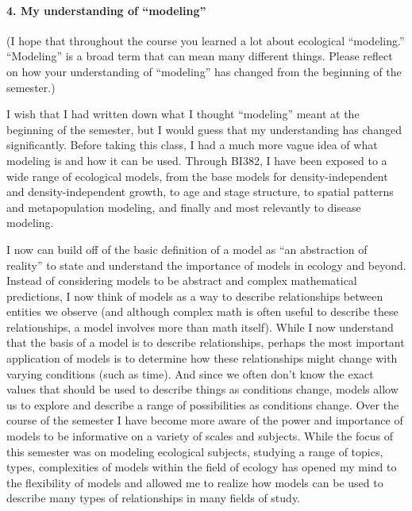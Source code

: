 \documentclass[]{article}
\let\oldparagraph\paragraph
\renewcommand{\paragraph}[1]{\oldparagraph{#1}\mbox{}}
\begin{document}
\hypertarget{my-understanding-of-modeling}{%
\paragraph{4. My understanding of
``modeling''}\label{my-understanding-of-modeling}}

(I hope that throughout the course you learned a lot about ecological
``modeling.'' ``Modeling'' is a broad term that can mean many different
things. Please reflect on how your understanding of ``modeling'' has
changed from the beginning of the semester.)

I wish that I had written down what I thought ``modeling'' meant at the
beginning of the semester, but I would guess that my understanding has
changed significantly. Before taking this class, I had a much more vague
idea of what modeling is and how it can be used. Through BI382, I have
been exposed to a wide range of ecological models, from the base models
for density-independent and density-independent growth, to age and stage
structure, to spatial patterns and metapopulation modeling, and finally
and most relevantly to disease modeling.

I now can build off of the basic definition of a model as ``an
abstraction of reality'' to state and understand the importance of
models in ecology and beyond. Instead of considering models to be
abstract and complex mathematical predictions, I now think of models as
a way to describe relationships between entities we observe (and
although complex math is often useful to describe these relationships, a
model involves more than math itself). While I now understand that the
basis of a model is to describe relationships, perhaps the most
important application of models is to determine how these relationships
might change with varying conditions (such as time). And since we often
don't know the exact values that should be used to describe things as
conditions change, models allow us to explore and describe a range of
possibilities as conditions change. Over the course of the semester I
have become more aware of the power and importance of models to be
informative on a variety of scales and subjects. While the focus of this
semester was on modeling ecological subjects, studying a range of
topics, types, complexities of models within the field of ecology has
opened my mind to the flexibility of models and allowed me to realize
how models can be used to describe many types of relationships in many
fields of study.
\end{document}
